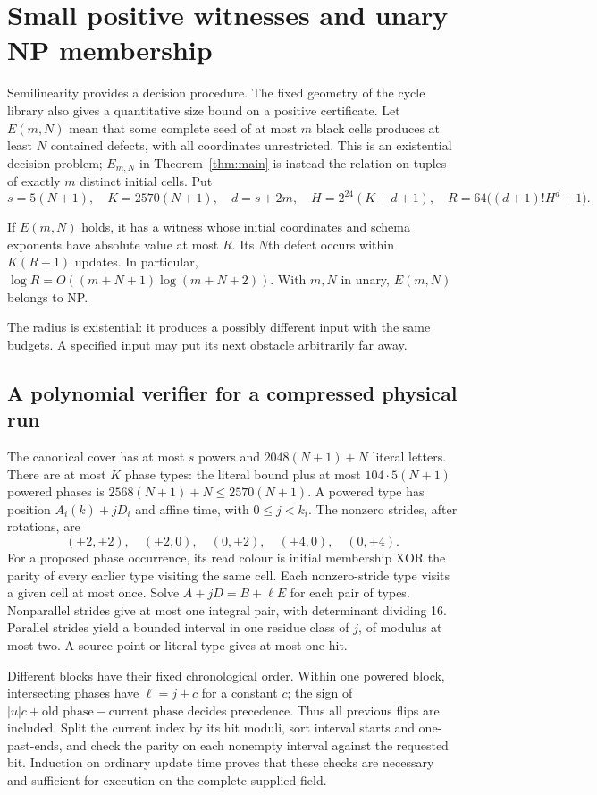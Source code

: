\section{Small positive witnesses and unary NP membership}\label{sec:small}
Semilinearity provides a decision procedure. The fixed geometry of the cycle
library also gives a quantitative size bound on a positive certificate.
Let $E(m,N)$ mean that some complete seed of at most $m$ black cells produces
at least $N$ contained defects, with all coordinates unrestricted. This is an
existential decision problem; $E_{m,N}$ in Theorem~\ref{thm:main} is instead
the relation on tuples of exactly $m$ distinct initial cells. Put
\[
 s=5(N+1),\quad K=2570(N+1),\quad d=s+2m,\quad
 H=2^{24}(K+d+1),\quad R=64\bigl((d+1)!H^d+1\bigr).
\]
\begin{theorem}\label{thm:small}
If $E(m,N)$ holds, it has a witness whose initial coordinates and schema
exponents have absolute value at most $R$. Its $N$th defect occurs within
$K(R+1)$ updates. In particular,
$\log R=O((m+N+1)\log(m+N+2))$.
With $m,N$ in unary, $E(m,N)$ belongs to NP.
\end{theorem}
The radius is existential: it produces a possibly different input with the
same budgets. A specified input may put its next obstacle arbitrarily far away.

\subsection{A polynomial verifier for a compressed physical run}
The canonical cover has at most $s$ powers and $2048(N+1)+N$ literal letters.
There are at most $K$ phase types: the literal bound plus at most
$104\cdot5(N+1)$ powered phases is
$2568(N+1)+N\le2570(N+1)$. A powered type has position
$A_i(k)+jD_i$ and affine time, with $0\le j<k_i$. The nonzero strides,
after rotations, are
\[
 (\pm2,\pm2),\quad(\pm2,0),\quad(0,\pm2),\quad
 (\pm4,0),\quad(0,\pm4).
\]
For a proposed phase occurrence, its read colour is initial membership XOR
the parity of every earlier type visiting the same cell. Each nonzero-stride
type visits a given cell at most once. Solve
$A+jD=B+\ell E$ for each pair of types. Nonparallel strides give at most
one integral pair, with determinant dividing 16. Parallel strides yield a
bounded interval in one residue class of $j$, of modulus at most two.
A source point or literal type gives at most one hit.

Different blocks have their fixed chronological order. Within one powered
block, intersecting phases have $\ell=j+c$ for a constant $c$; the sign of
$|u|c+\text{old phase}-\text{current phase}$ decides precedence. Thus all
previous flips are included. Split the current index by its hit moduli,
sort interval starts and one-past-ends, and check the parity on each nonempty
interval against the requested bit. Induction on ordinary update time proves
that these checks are necessary and sufficient for execution on the complete
supplied field.

